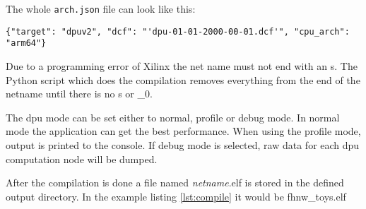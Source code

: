 The whole \texttt{arch.json} file can look like this:
\begin{lstlisting}[style=bash, caption={}, label=lst:arch_json]
  {"target": "dpuv2", "dcf": "'dpu-01-01-2000-00-01.dcf'", "cpu_arch": "arm64"}
\end{lstlisting}

Due to a programming error of Xilinx the net name must not end with an s.
The Python script which does the compilation removes everything from the end of the netname until there is no s or \_0.

The \acrshort{dpu} mode can be set either to normal, profile or debug mode.
In normal mode the application can get the best performance.
When using the profile mode, output is printed to the console.
If debug mode is selected, raw data for each \acrshort{dpu} computation node will be dumped.

After the compilation is done a file named \textit{netname}.elf is stored in the defined output directory.
In the example listing \ref{lst:compile} it would be fhnw\_toys.elf
